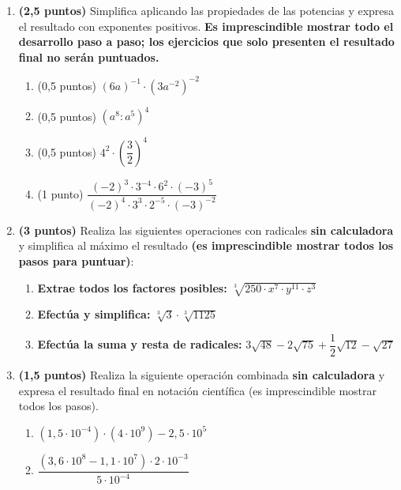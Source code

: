 \documentclass[a4paper,12pt]{extarticle}
\begin{document}
    \begin{enumerate}
        \item \textbf{(2,5 puntos)} Simplifica aplicando las propiedades de las potencias y expresa el resultado con exponentes positivos. \textbf{Es imprescindible mostrar todo el desarrollo paso a paso; los ejercicios que solo presenten el resultado final no serán puntuados.}
            \begin{enumerate}
                \item (0,5 puntos) $(6a)^{-1 }\cdot (3a^{-2})^{-2}$
                \item (0,5 puntos) $(a^8 : a^5)^4$ 
                \item (0,5 puntos) $4^2 \cdot \left(\dfrac{3}{2}\right)^4$
                \item (1 punto)  $\dfrac{(-2)^{3} \cdot 3^{-4} \cdot 6^{2} \cdot (-3)^{5}}{(-2)^{4} \cdot 3^{3} \cdot 2^{-5} \cdot (-3)^{-2}}$
            \end{enumerate}

        \item \textbf{(3 puntos)} Realiza las siguientes operaciones con radicales \textbf{sin calculadora} y simplifica al máximo el resultado \textbf{(es imprescindible mostrar todos los pasos para puntuar)}:
        \begin{enumerate}[label=\alph*)]
            \item \textbf{Extrae todos los factores posibles:} $\sqrt[3]{250 \cdot x^{7} \cdot y^{11} \cdot z^{3}}$
            \item \textbf{Efectúa y simplifica:} $\sqrt[3]{3} \cdot \sqrt[3]{1125}$
            \item \textbf{Efectúa la suma y resta de radicales:} $3\sqrt{48} - 2\sqrt{75} + \dfrac{1}{2}\sqrt{12} - \sqrt{27}$
        \end{enumerate}
        

        \item \textbf{(1,5 puntos)} Realiza la siguiente operación combinada \textbf{sin calculadora} y expresa el resultado final en notación científica (es imprescindible mostrar todos los pasos).
        \begin{enumerate}
            \item $(1,5 \cdot 10^{-4}) \cdot (4 \cdot 10^{9}) - 2,5 \cdot 10^{5}$
            \item $\dfrac{(3,6 \cdot 10^{8} - 1,1 \cdot 10^{7}) \cdot 2 \cdot 10^{-3}}{5 \cdot 10^{-4}}$
        \end{enumerate}
        

\end{enumerate}
\end{document}
